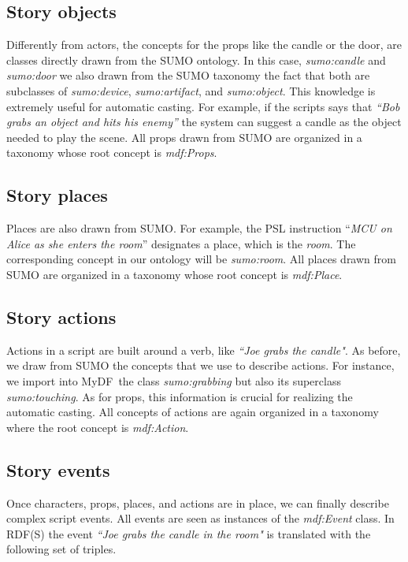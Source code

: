 \documentclass[a4paper,UKenglish]{oasics}
\newcommand{\mydf}{MyDF}
\newcommand{\ns}{mdf{:}}
\newcommand{\class}[1]{{\it#1}}
\begin{document}
\subsection{Story objects}
Differently from actors, the concepts for the props like the candle or the door, are classes directly drawn from the SUMO ontology. In this case, 
\class{sumo{:}candle} and 
\class{sumo{:}door} we also drawn from the SUMO taxonomy the fact that both are subclasses of 
\class{sumo{:}device},
\class{sumo{:}artifact}, and
\class{sumo{:}object}.
This knowledge is extremely useful for automatic casting. For example, if the scripts says that \emph{``Bob grabs an object and hits his enemy''} the system can suggest a candle as the object needed to play the scene.
All props drawn from SUMO are organized in a taxonomy whose root concept is 
\class{\ns Props}.

\subsection{Story places}
Places are also drawn from SUMO. 
For example, the PSL instruction 
``\emph{MCU on Alice as she enters the room}''
designates a place, which is the \emph{room}.
The corresponding concept in our ontology will be 
\class{sumo{:}room}.
All places drawn from SUMO are organized in a taxonomy whose root concept is 
\class{\ns Place}.
 
\subsection{Story actions}
Actions in a script are built around a verb, like \emph{``Joe \emph{grabs} the candle"}.
As before, we draw from SUMO the concepts that we use to describe actions.
For instance, we import into \mydf\ the class 
\class{sumo:grabbing}
but also its superclass
\class{sumo:touching}. As for props, this information is crucial for realizing the automatic casting. All concepts of actions are again organized in a taxonomy where the  root concept is 
\class{\ns Action}.

\subsection{Story events}
Once characters, props, places, and actions are in place, we can finally describe complex script events. 
All events are seen as instances of the \class{\ns Event} class. 
In RDF(S) the event \emph{``Joe grabs the candle in the room"} is translated with the following set of triples.
\end{document}
